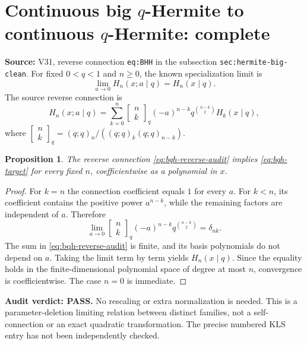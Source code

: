 \documentclass[11pt]{article}
\newtheorem{proposition}{Proposition}
\begin{document}
\section{Continuous big $q$-Hermite to continuous $q$-Hermite: complete}
\noindent\textbf{Source:} V31, reverse connection \texttt{eq:BHH} in the subsection \texttt{sec:hermite-big-clean}. For fixed $0<q<1$ and $n\ge0$, the known specialization limit is
\begin{equation}\label{eq:bqh-target}
 \lim_{a\to0}H_n(x;a\mid q)=H_n(x\mid q).
\end{equation}
The source reverse connection is
\begin{equation}\label{eq:bqh-reverse-audit}
 H_n(x;a\mid q)=\sum_{k=0}^{n}
 \begin{bmatrix}n\\k\end{bmatrix}_q
 (-a)^{n-k}q^{\binom{n-k}{2}}H_k(x\mid q),
\end{equation}
where $\begin{bmatrix}n\\k\end{bmatrix}_q=(q;q)_n/((q;q)_k(q;q)_{n-k})$.
\begin{proposition}
The reverse connection \eqref{eq:bqh-reverse-audit} implies \eqref{eq:bqh-target} for every fixed $n$, coefficientwise as a polynomial in $x$.
\end{proposition}
\begin{proof}
For $k=n$ the connection coefficient equals $1$ for every $a$. For $k<n$, its coefficient contains the positive power $a^{n-k}$, while the remaining factors are independent of $a$. Therefore
\[
 \lim_{a\to0}\begin{bmatrix}n\\k\end{bmatrix}_q
 (-a)^{n-k}q^{\binom{n-k}{2}}=\delta_{nk}.
\]
The sum in \eqref{eq:bqh-reverse-audit} is finite, and its basis polynomials do not depend on $a$. Taking the limit term by term yields $H_n(x\mid q)$. Since the equality holds in the finite-dimensional polynomial space of degree at most $n$, convergence is coefficientwise. The case $n=0$ is immediate.
\end{proof}
\noindent\textbf{Audit verdict: PASS.} No rescaling or extra normalization is needed. This is a parameter-deletion limiting relation between distinct families, not a self-connection or an exact quadratic transformation. The precise numbered KLS entry has not been independently checked.
\end{document}
